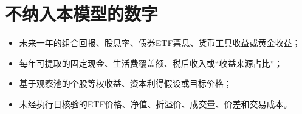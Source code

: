 \section{不纳入本模型的数字}

\begin{itemize}
  \item 未来一年的组合回报、股息率、债券ETF票息、货币工具收益或黄金收益；
  \item 每年可提取的固定现金、生活费覆盖额、税后收入或“收益来源占比”；
  \item 基于观察池的个股等权收益、资本利得假设或目标价格；
  \item 未经执行日核验的ETF价格、净值、折溢价、成交量、价差和交易成本。
\end{itemize}

